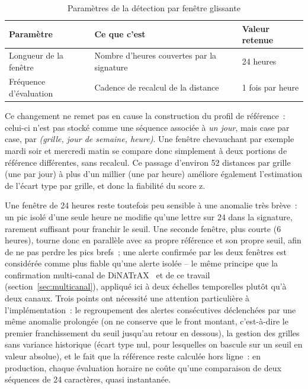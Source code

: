 \begin{table}[htbp]
  \centering
  \caption{Paramètres de la détection par fenêtre glissante}
  \label{tab:sliding}
  \begin{tabular}{lll}
    \toprule
    \textbf{Paramètre} & \textbf{Ce que c'est} & \textbf{Valeur retenue} \\
    \midrule
    Longueur de la fenêtre    & Nombre d'heures couvertes par la signature & 24 heures \\
    Fréquence d'évaluation    & Cadence de recalcul de la distance         & 1 fois par heure \\
    \bottomrule
  \end{tabular}
\end{table}

Ce changement ne remet pas en cause la construction du profil de
référence~: celui-ci n'est pas stocké comme une séquence associée à
\emph{un jour}, mais case par case, par \emph{(grille, jour de
semaine, heure)}. Une fenêtre chevauchant par exemple mardi soir et
mercredi matin se compare donc simplement à deux portions de
référence différentes, sans recalcul. Ce passage d'environ 52
distances par grille (une par jour) à plus d'un millier (une par
heure) améliore également l'estimation de l'écart type par grille, et
donc la fiabilité du score z.

Une fenêtre de 24 heures reste toutefois peu sensible à une anomalie
très brève~: un pic isolé d'une seule heure ne modifie qu'une lettre
sur 24 dans la signature, rarement suffisant pour franchir le seuil.
Une seconde fenêtre, plus courte (6 heures), tourne donc en parallèle
avec sa propre référence et son propre seuil, afin de ne pas perdre
les pics brefs~; une alerte confirmée par les deux fenêtres est
considérée comme plus fiable qu'une alerte isolée -- le même principe
que la confirmation multi-canal de DiNATrAX~\parencite{maudoux2024dinatrax}
et de ce travail (section~\ref{sec:multicanal}), appliqué ici à deux
échelles temporelles plutôt qu'à deux canaux. Trois points ont
nécessité une attention particulière à l'implémentation~: le
regroupement des alertes consécutives déclenchées par une même
anomalie prolongée (on ne conserve que le front montant, c'est-à-dire
le premier franchissement du seuil jusqu'au retour en dessous), la
gestion des grilles sans variance historique (écart type nul, pour
lesquelles on bascule sur un seuil en valeur absolue), et le fait que
la référence reste calculée hors ligne~: en production, chaque
évaluation horaire ne coûte qu'une comparaison de deux séquences de
24 caractères, quasi instantanée.

